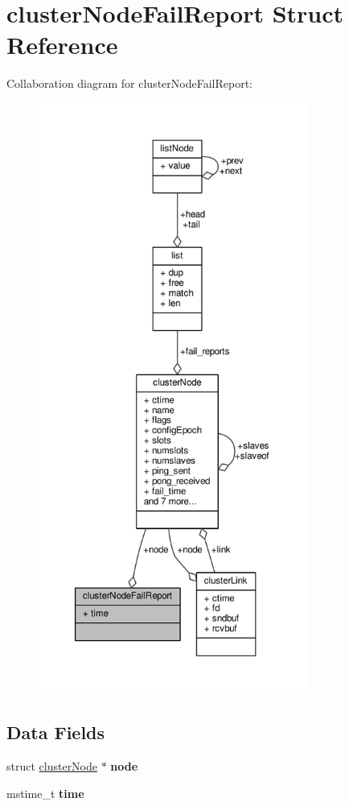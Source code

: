 \hypertarget{structclusterNodeFailReport}{}\section{cluster\+Node\+Fail\+Report Struct Reference}
\label{structclusterNodeFailReport}


Collaboration diagram for cluster\+Node\+Fail\+Report\+:\nopagebreak
\begin{figure}[H]
\begin{center}
\leavevmode
\includegraphics[height=550pt]{structclusterNodeFailReport__coll__graph}
\end{center}
\end{figure}
\subsection*{Data Fields}
\begin{DoxyCompactItemize}
\item 
\mbox{\label{structclusterNodeFailReport_ad6b6931afca6e6d732ef32adcbd93585}} 
struct \hyperlink{structclusterNode}{cluster\+Node} $\ast$ {\bfseries node}
\item 
\mbox{\label{structclusterNodeFailReport_ae635d169cc9256b72c5cb8e6beb3d873}} 
mstime\+\_\+t {\bfseries time}
\end{DoxyCompactItemize}


